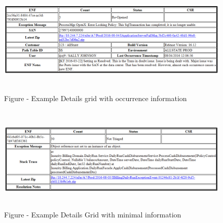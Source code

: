 \documentclass[a4paper,12pt]{report}
\begin{document}
\begin{figure}[H]
\begin{center}
\includegraphics[width=6.5in,height=2.13in]{./uploads_new/ENF_Alert_Emails.docx_DIR/media/image3.png}
\end{center}
\caption{Figure  - Example Details grid with occurrence information}
\end{figure}




\vspace{12pt}
 \par




\begin{figure}[H]
\begin{center}
\includegraphics[width=6.5in,height=1.99in]{./uploads_new/ENF_Alert_Emails.docx_DIR/media/image4.png}
\end{center}
\caption{Figure  - Example Details Grid with minimal information}
\end{figure}




\vspace{12pt}
 \par


\end{document}
